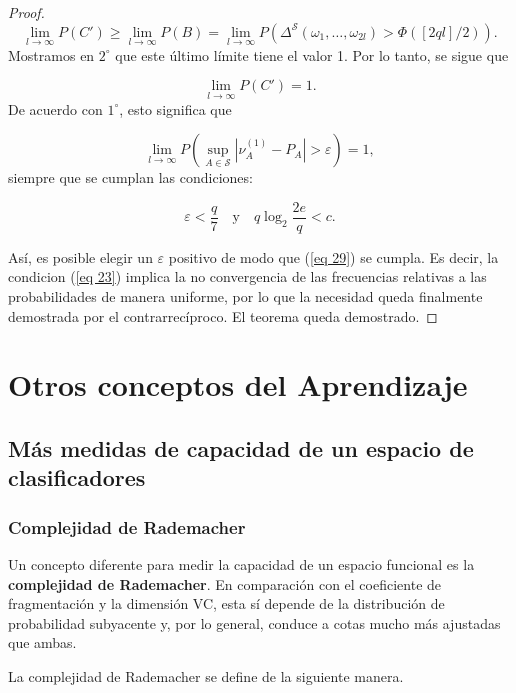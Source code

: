 \documentclass{report}
\begin{document}
\begin{proof}
\[
\lim_{l \to \infty} P(C') \geq \lim_{l \to \infty} P(B) = \lim_{l \to \infty} P(\Delta^{\mathcal{S}}(\omega_1, \dots, \omega_{2l}) > \Phi([2q l]/2)).
\]
Mostramos en \( 2^\circ \) que este último límite tiene el valor 1. Por lo tanto, se sigue que 

\[
\lim_{l \to \infty} P(C') = 1.
\]
De acuerdo con \( 1^\circ \), esto significa que 

\begin{equation}\label{eq 29}
\lim_{l \to \infty} P\left( \sup_{A \in \mathcal{S}} \left| \nu_A^{(1)} - P_A \right| > \varepsilon \right) = 1,
\end{equation}
siempre que se cumplan las condiciones:

\[
\varepsilon < \frac{q}{7} \quad \text{y} \quad q \log_2 \frac{2e}{q} < c.
\]\newline

Así, es posible elegir un \( \varepsilon \) positivo de modo que (\ref{eq 29}) se cumpla. Es decir,
la condicion (\ref{eq 23}) implica la no convergencia de las frecuencias relativas a las probabilidades de manera uniforme,
por lo que la necesidad queda finalmente demostrada por el contrarrecíproco. El teorema queda demostrado.

\end{proof}
    




\chapter{Otros conceptos del Aprendizaje}

\section{Más medidas de capacidad de un espacio de clasificadores}
\subsection{Complejidad de Rademacher}
Un concepto diferente para medir la capacidad de un espacio funcional es la \textbf{complejidad de Rademacher}. 
En comparación con el coeficiente de fragmentación y la dimensión VC, esta sí depende de la distribución de 
probabilidad subyacente y, por lo general, conduce a cotas mucho más ajustadas que ambas.\newline

La complejidad de Rademacher se define de la siguiente manera.\newline
\end{document}
